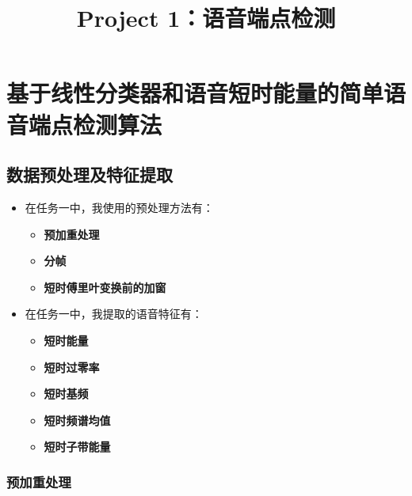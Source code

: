 \documentclass[a4paper]{article}
\title{Project 1：语音端点检测}
\begin{document}
\maketitle

\section{基于线性分类器和语音短时能量的简单语音端点检测算法}

\subsection{数据预处理及特征提取}

\begin{itemize}
  \item 
  {
    在任务一中，我使用的预处理方法有：
    \begin{itemize}
      \item \textbf{预加重处理}
      \item \textbf{分帧}
      \item \textbf{短时傅里叶变换前的加窗}
    \end{itemize}
  }
  \item 
  {
    在任务一中，我提取的语音特征有：
    \begin{itemize}
      \item \textbf{短时能量}
      \item \textbf{短时过零率}
      \item \textbf{短时基频}
      \item \textbf{短时频谱均值}
      \item \textbf{短时子带能量}
    \end{itemize}
  }
  \end{itemize}
  

\subsubsection{预加重处理}
\end{document}
